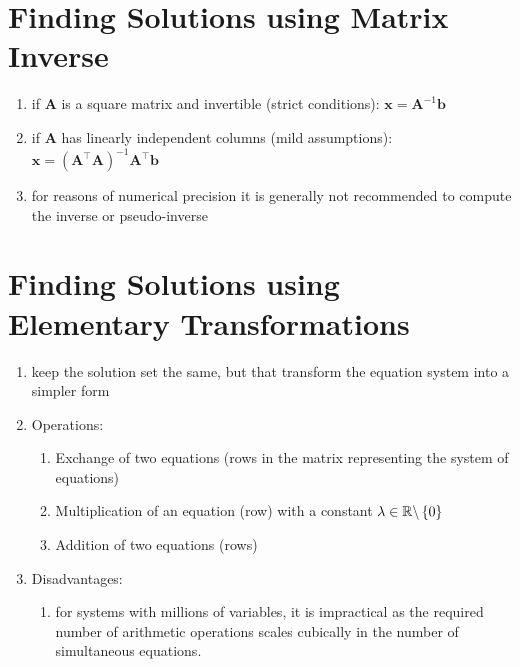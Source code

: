 \section{Finding Solutions using Matrix Inverse}

\begin{enumerate}
    \item if $\bm{A}$ is a square matrix and invertible (strict conditions): $\bm{x} = \bm{A}^{-1}\bm{b}$
    \hfill \cite{mfml/book/mml/Deisenroth-Faisal-Ong}

    \item if $\bm{A}$ has linearly independent columns (mild assumptions): $\bm{x} = (\bm{A}^\top  \bm{A})^{-1}\bm{A}^\top \bm{b}$
    \hfill \cite{mfml/book/mml/Deisenroth-Faisal-Ong}

    \item for reasons of numerical precision it is generally not recommended to compute the inverse or pseudo-inverse
    \hfill \cite{mfml/book/mml/Deisenroth-Faisal-Ong}
\end{enumerate}


\section{Finding Solutions using Elementary Transformations}

\begin{enumerate}
    \item keep the solution set the same, but that transform the equation system into a simpler form
    \hfill \cite{mfml/book/mml/Deisenroth-Faisal-Ong}

    \item Operations:
    \begin{enumerate}
        \item Exchange of two equations (rows in the matrix representing the system of equations)
        \hfill \cite{mfml/book/mml/Deisenroth-Faisal-Ong}

        \item Multiplication of an equation (row) with a constant $\lambda \in \mathbb{R} \backslash \left\{0\right\}$
        \hfill \cite{mfml/book/mml/Deisenroth-Faisal-Ong}

        \item Addition of two equations (rows)
        \hfill \cite{mfml/book/mml/Deisenroth-Faisal-Ong}
    \end{enumerate}

    \item Disadvantages:
    \begin{enumerate}
        \item for systems with millions of variables, it is impractical as the required number of arithmetic operations scales cubically in the number of simultaneous equations.
        \hfill \cite{mfml/book/mml/Deisenroth-Faisal-Ong}
    \end{enumerate}
\end{enumerate}



